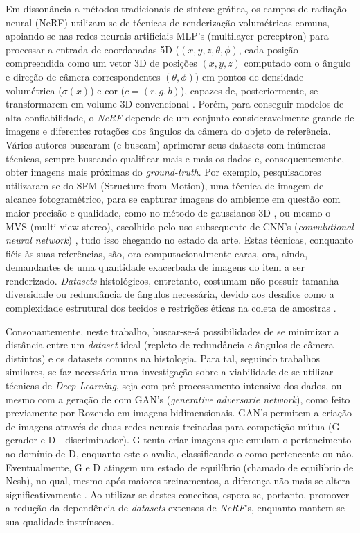 Em dissonância a métodos tradicionais de síntese gráfica, os campos de radiação neural (NeRF) utilizam-se de técnicas de renderização volumétricas comuns, apoiando-se nas redes neurais artificiais MLP's (multilayer perceptron) para processar a entrada de coordanadas 5D ($(x, y, z, \theta, \phi)$, cada posição compreendida como um vetor 3D de posições $(x, y, z)$ computado com o ângulo e direção de câmera correspondentes $(\theta, \phi)$) em pontos de densidade volumétrica ($\sigma (x)$) e cor ($c = (r, g, b)$), capazes de, posteriormente, se transformarem em volume 3D convencional \cite{mildenhall2020nerfrepresentingscenesneural}. Porém, para conseguir modelos de alta confiabilidade, o \textit{NeRF} depende de um conjunto consideravelmente grande de imagens e diferentes rotações dos ângulos da câmera do objeto de referência. Vários autores buscaram (e buscam) aprimorar seus datasets com inúmeras técnicas, sempre buscando qualificar mais e mais os dados e, consequentemente, obter imagens mais próximas do \textit{ground-truth}. Por exemplo, pesquisadores utilizaram-se do SFM  (Structure from Motion), uma técnica de imagem de alcance fotogramétrico, para se capturar imagens do ambiente em questão com maior precisão e qualidade, como no método de gaussianos 3D \cite{kerbl3Dgaussians}, ou mesmo o MVS (multi-view stereo), escolhido pelo uso subsequente de CNN's (\textit{convulutional neural network}) \cite{chen2021mvsnerffastgeneralizableradiance}, tudo isso chegando no estado da arte. Estas técnicas, conquanto fiéis às suas referências, são, ora computacionalmente caras, ora, ainda, demandantes de uma quantidade exacerbada de imagens do item a ser renderizado. \textit{Datasets} histológicos, entretanto, costumam não possuir tamanha diversidade ou redundância de ângulos necessária, devido aos desafios como a complexidade estrutural dos tecidos e restrições éticas na coleta de amostras \cite{XUE2021101816}.

Consonantemente, neste trabalho, buscar-se-á possibilidades de se minimizar a distância entre um \textit{dataset} ideal (repleto de redundância e ângulos de câmera distintos) e os datasets comuns na histologia. Para tal, seguindo trabalhos similares, se faz necessária uma investigação sobre a viabilidade de se utilizar técnicas de \textit{Deep Learning}, seja com pré-processamento intensivo dos dados, ou mesmo com a geração de com GAN's (\textit{generative adversarie network}), como feito previamente por Rozendo \cite{rozendo2024histdataaug} em imagens bidimensionais. GAN's  permitem a criação de imagens através de duas redes neurais treinadas para competição mútua (G - gerador e  D - discriminador). G tenta criar imagens que emulam o pertencimento ao domínio de D, enquanto este o avalia, classificando-o como pertencente ou não. Eventualmente, G e D atingem um estado de equilíbrio (chamado de equilibrio de Nesh), no qual, mesmo após maiores treinamentos, a diferença não mais se altera significativamente \cite{goodfellow2014generativeadversarialnetworks} . Ao utilizar-se destes conceitos, espera-se, portanto, promover a redução da dependência de \textit{datasets} extensos de \textit{NeRF}'s, enquanto mantem-se sua qualidade instrínseca.
